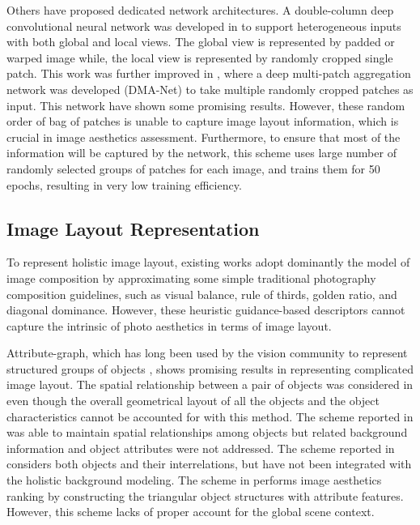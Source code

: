 \documentclass[10pt,twocolumn,letterpaper]{article}
\begin{document}
	Others have proposed dedicated network architectures. A double-column deep convolutional neural network was developed in \cite{Lu:2014:ACMMM} to support heterogeneous inputs with both global and local views. The global view is represented by padded or warped image while, the local view is represented by randomly cropped single patch. This work was further improved in \cite{Lu:2015:ICCV}, where a deep multi-patch aggregation network was developed (DMA-Net) to take multiple randomly cropped patches as input. This network have shown some promising results. However, these random order of bag of patches is unable to capture image layout information, which is crucial in image aesthetics assessment. Furthermore, to ensure that most of the information will be captured by the network, this scheme uses large number of randomly selected groups of patches for each image, and trains them for 50 epochs, resulting in very low training efficiency.
	
	\subsection{Image Layout Representation}
	To represent holistic image layout, existing works \cite{2010:optimizing_composition,2010:ICIP:composition,2012:ICIP:composition,ICML:2012:composition,Yao:2012:oscar,Ma:2014:ICIP:photography,Ma:2014:ACMMM:pose,Zhou:2015:ACMMM:vanishing_point} adopt dominantly the model of image composition by approximating some simple traditional photography composition guidelines, such as visual balance, rule of thirds, golden ratio, and diagonal dominance. However, these heuristic guidance-based descriptors cannot capture the intrinsic of photo aesthetics in terms of image layout. 
	
	Attribute-graph, which has long been used by the vision community to represent structured groups of objects \cite{Felzenszwalb:2004:graph_seg,Lu:2014:graph,CVPR:2014:multigraph,Shi:2000:PAMI:graph,TIP:2014:graphlet}, shows promising results in representing complicated image layout.   The spatial relationship between a pair of objects was considered in \cite{Lan:2012:ECCV:retrieval} even though the overall geometrical layout of all the objects and the object characteristics cannot be accounted for with this method. The scheme reported in \cite{Xu:2010:SIGAPH:concep_map} was able to maintain spatial relationships among objects but related background information and object attributes were not addressed. The scheme reported in  \cite{2013:PAMI:description} considers both objects and their interrelations, but have not been integrated with the holistic background modeling. The scheme in \cite{Cao:2014:ACMMM:layout} performs image aesthetics ranking by constructing the triangular object structures with attribute features. However, this scheme lacks of proper account for the global scene context.
	
\end{document}

